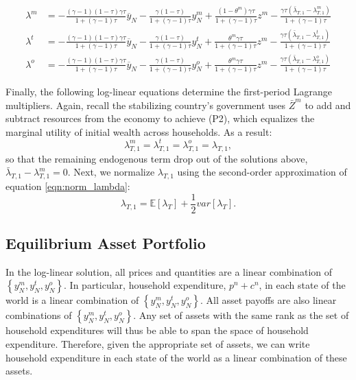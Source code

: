 \begin{align*}
  \lambda^m & = - \frac{(\gamma - 1)(1 - \tau) \gamma \tau}{1 + (\gamma - 1) \tau} \overline{y}_N
              - \frac{\gamma (1 - \tau)}{1 + (\gamma - 1) \tau} y_N^m
              + \frac{\left( 1 - \theta^m \right) \gamma \tau}{1 + (\gamma - 1) \tau} z^{m}
              - \frac{\gamma \tau \left( \bar{\lambda}_{T, 1} - \lambda^m_{T, 1} \right)}{1 + (\gamma - 1) \tau}\\
  \lambda^t & = - \frac{(\gamma - 1)(1 - \tau) \gamma \tau}{1 + (\gamma - 1) \tau} \overline{y}_N
              - \frac{\gamma (1 - \tau)}{1 + (\gamma - 1) \tau} y_N^t
              + \frac{\theta^m \gamma \tau}{1 + (\gamma - 1) \tau} z^{m}
              - \frac{\gamma \tau \left( \bar{\lambda}_{T, 1} - \lambda^t_{T, 1} \right)}{1 + (\gamma - 1) \tau}  \\
  \lambda^o & = - \frac{(\gamma - 1)(1 - \tau) \gamma \tau}{1 + (\gamma - 1) \tau} \overline{y}_N
              - \frac{\gamma (1 - \tau)}{1 + (\gamma - 1) \tau} y_N^o + 
              \frac{\theta^m \gamma \tau}{1 + (\gamma - 1) \tau} z^{m}
              - \frac{\gamma \tau \left( \bar{\lambda}_{T, 1} - \lambda^o_{T, 1} \right)}{1 + (\gamma - 1) \tau} 
\end{align*}

Finally, the following log-linear equations determine the first-period
Lagrange multipliers. Again, recall the stabilizing country's
government uses $\bar{Z}^m$ to add and subtract resources from the
economy to achieve (P2), which equalizes the marginal utility of
initial wealth across households. As a result:
\begin{equation*}
  \lambda^m_{T, 1} = \lambda^t_{T, 1} = \lambda^o_{T, 1} = \lambda_{T, 1},
\end{equation*}
so that the remaining endogenous term drop out of the solutions above,
\(\bar{\lambda}_{T, 1} - \lambda^m_{T, 1}=0\). Next, we normalize
$\lambda_{T, 1}$ using the second-order approximation of equation
\eqref{eqn:norm_lambda}:
\begin{equation*}
  \lambda_{T, 1}
  = \mathbb{E} \left[ \lambda_{T} \right]
  + \frac{1}{2} var\left[ \lambda_{T} \right].
\end{equation*}

\subsection{Equilibrium Asset Portfolio
  \label{Appendix_Decentralization}}

In the log-linear solution, all prices and quantities are a linear
combination of $\left\{ y_N^m, y_N^t, y_N^o\right\}$. In particular, household
expenditure, $p^n + c^n$, in each state of the world is a linear
combination of $\left\{ y_N^m, y_N^t, y_N^o\right\}$. All asset payoffs are also
linear combinations of $\left\{ y_N^m, y_N^t, y_N^o\right\}$. Any set of assets with
the same rank as the set of household expenditures will thus be able to span the
space of household expenditure. Therefore, given the appropriate set of
assets, we can write household expenditure in each state of the world as a
linear combination of these assets.

